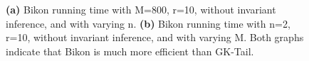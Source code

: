 \begin{figure}[!t]
\centering
{}
\caption{\textbf{(a)} Bikon running time with M=800, r=10, without
  invariant inference, and with varying n. \textbf{(b)} Bikon running
  time with n=2, r=10, without invariant inference, and with varying
  M. Both graphs indicate that Bikon is much more efficient than
  GK-Tail.}
\label{fig:perf2}
\end{figure}








